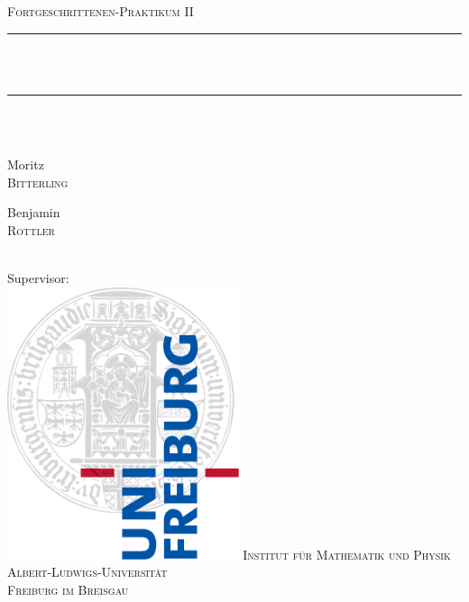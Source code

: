 \newcommand{\HRule}{\rule{\linewidth}{0.5mm}}
\begin{titlepage}
\begin{center}
  \textsc{\Large Fortgeschrittenen-Praktikum II}\\[0.5cm]
  \HRule \\[0.4cm]
  { \huge \bfseries \exptitle}\\
  \HRule \\[0.5cm]
  \large \expdate\\[0.5cm]  
  \begin{minipage}{0.4\textwidth}
    \begin{flushleft} \large
      Moritz \\ \textsc{Bitterling}
    \end{flushleft}
  \end{minipage}
  \hfill
  \begin{minipage}{0.4\textwidth}
    \begin{flushright} \large
      Benjamin \\ \textsc{Rottler}
    \end{flushright}
  \end{minipage}
  \\[1cm]
  \large 
  Supervisor: \exptutor \\[3cm]
  \includegraphics[height=8cm]{../../img/logo_uni.pdf}
  \vfill
  \normalsize
  \textsc{Institut für Mathematik und Physik} \\
  \textsc{Albert-Ludwigs-Universität} \\
  \textsc{Freiburg im Breisgau}
\end{center}
\end{titlepage}
